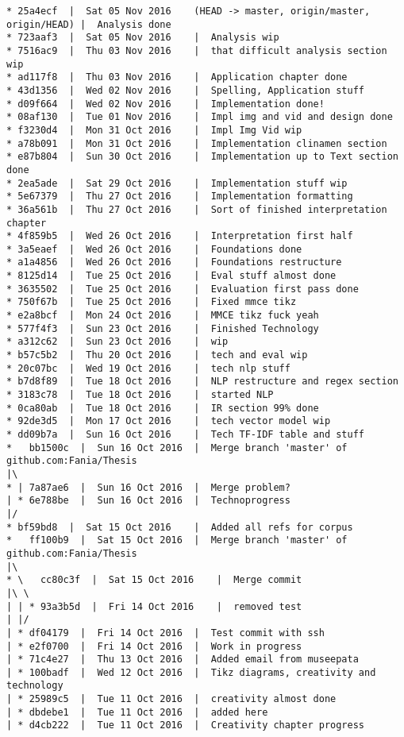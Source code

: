 \begin{verbatim}
* 25a4ecf  |  Sat 05 Nov 2016	 (HEAD -> master, origin/master, origin/HEAD) |  Analysis done
* 723aaf3  |  Sat 05 Nov 2016	 |  Analysis wip
* 7516ac9  |  Thu 03 Nov 2016	 |  that difficult analysis section wip
* ad117f8  |  Thu 03 Nov 2016	 |  Application chapter done
* 43d1356  |  Wed 02 Nov 2016	 |  Spelling, Application stuff
* d09f664  |  Wed 02 Nov 2016	 |  Implementation done!
* 08af130  |  Tue 01 Nov 2016	 |  Impl img and vid and design done
* f3230d4  |  Mon 31 Oct 2016	 |  Impl Img Vid wip
* a78b091  |  Mon 31 Oct 2016	 |  Implementation clinamen section
* e87b804  |  Sun 30 Oct 2016	 |  Implementation up to Text section done
* 2ea5ade  |  Sat 29 Oct 2016	 |  Implementation stuff wip
* 5e67379  |  Thu 27 Oct 2016	 |  Implementation formatting
* 36a561b  |  Thu 27 Oct 2016	 |  Sort of finished interpretation chapter
* 4f859b5  |  Wed 26 Oct 2016	 |  Interpretation first half
* 3a5eaef  |  Wed 26 Oct 2016	 |  Foundations done
* a1a4856  |  Wed 26 Oct 2016	 |  Foundations restructure
* 8125d14  |  Tue 25 Oct 2016	 |  Eval stuff almost done
* 3635502  |  Tue 25 Oct 2016	 |  Evaluation first pass done
* 750f67b  |  Tue 25 Oct 2016	 |  Fixed mmce tikz
* e2a8bcf  |  Mon 24 Oct 2016	 |  MMCE tikz fuck yeah
* 577f4f3  |  Sun 23 Oct 2016	 |  Finished Technology
* a312c62  |  Sun 23 Oct 2016	 |  wip
* b57c5b2  |  Thu 20 Oct 2016	 |  tech and eval wip
* 20c07bc  |  Wed 19 Oct 2016	 |  tech nlp stuff
* b7d8f89  |  Tue 18 Oct 2016	 |  NLP restructure and regex section
* 3183c78  |  Tue 18 Oct 2016	 |  started NLP
* 0ca80ab  |  Tue 18 Oct 2016	 |  IR section 99% done
* 92de3d5  |  Mon 17 Oct 2016	 |  tech vector model wip
* dd09b7a  |  Sun 16 Oct 2016	 |  Tech TF-IDF table and stuff
*   bb1500c  |  Sun 16 Oct 2016	 |  Merge branch 'master' of github.com:Fania/Thesis
|\  
* | 7a87ae6  |  Sun 16 Oct 2016	 |  Merge problem?
| * 6e788be  |  Sun 16 Oct 2016	 |  Technoprogress
|/  
* bf59bd8  |  Sat 15 Oct 2016	 |  Added all refs for corpus
*   ff100b9  |  Sat 15 Oct 2016	 |  Merge branch 'master' of github.com:Fania/Thesis
|\  
* \   cc80c3f  |  Sat 15 Oct 2016	 |  Merge commit
|\ \  
| | * 93a3b5d  |  Fri 14 Oct 2016	 |  removed test
| |/  
| * df04179  |  Fri 14 Oct 2016	 |  Test commit with ssh
| * e2f0700  |  Fri 14 Oct 2016	 |  Work in progress
| * 71c4e27  |  Thu 13 Oct 2016	 |  Added email from museepata
| * 100badf  |  Wed 12 Oct 2016	 |  Tikz diagrams, creativity and technology
| * 25989c5  |  Tue 11 Oct 2016	 |  creativity almost done
| * dbdebe1  |  Tue 11 Oct 2016	 |  added here
| * d4cb222  |  Tue 11 Oct 2016	 |  Creativity chapter progress

\end{verbatim}
